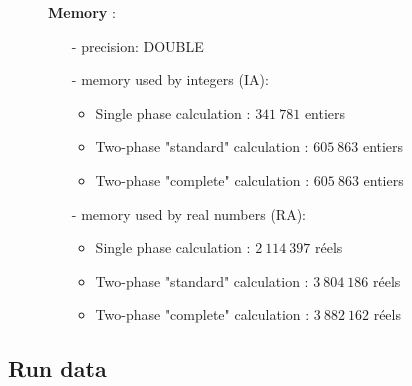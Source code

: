 \documentclass[a4paper,twoside,12pt]{article}
\begin{document}
\begin{description}
   \item[]\textbf{Memory} :
         \begin{itemize}
            \item[-] precision: DOUBLE
            \item[-] memory used by integers (IA):
                  \begin{itemize}
                     \item Single phase calculation : $341~781$ entiers
                     \item Two-phase "standard" calculation :  $605~863$ entiers
                     \item Two-phase "complete" calculation :  $605~863$  entiers
                  \end{itemize}
            \item[-] memory used by real numbers (RA):
                  \begin{itemize}
                     \item Single phase calculation : $2~114~397$ r\'eels
                     \item Two-phase "standard" calculation :  $3~804~186$ r\'eels
                     \item Two-phase "complete" calculation :  $3~882~162$ r\'eels
                  \end{itemize}
         \end{itemize}

\end{description}

\subsection{Run data}
\end{document}
